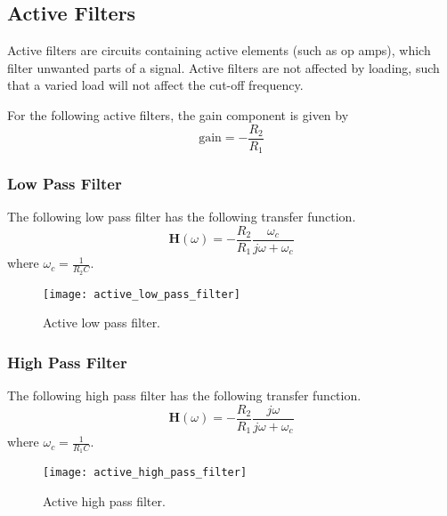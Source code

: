 \documentclass{article}
\begin{document}
\subsection{Active Filters}
Active filters are circuits containing active elements (such as op amps),
which filter unwanted parts of a signal.
Active filters are not affected by loading, such that a varied load will
not affect the cut-off frequency.

For the following active filters, the gain component is given by
\begin{equation*}
    \mathrm{gain} = -\frac{R_2}{R_1}
\end{equation*}
\subsubsection{Low Pass Filter}
The following low pass filter has the following transfer function.
\begin{equation*}
    \symbf{H}(\omega) = -\frac{R_2}{R_1}\frac{\omega_c}{j\omega + \omega_c}
\end{equation*}
where $\displaystyle \omega_c = \frac{1}{R_2C}$.
\begin{figure}[H]
    \centering
    \texttt{[image: active\_low\_pass\_filter]}
    \caption{Active low pass filter.}
\end{figure}
\subsubsection{High Pass Filter}
The following high pass filter has the following transfer function.
\begin{equation*}
    \symbf{H}(\omega) = -\frac{R_2}{R_1}\frac{j\omega}{j\omega + \omega_c}
\end{equation*}
where $\displaystyle \omega_c = \frac{1}{R_1C}$.
\begin{figure}[H]
    \centering
    \texttt{[image: active\_high\_pass\_filter]}
    \caption{Active high pass filter.}
\end{figure}
\end{document}
